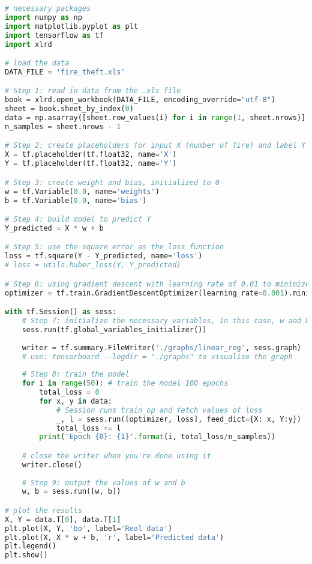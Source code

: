 \documentclass{article}
\begin{document}
\begin{lstlisting}[language=Python,morekeywords ={as}]
# necessary packages
import numpy as np
import matplotlib.pyplot as plt
import tensorflow as tf
import xlrd

# load the data
DATA_FILE = 'fire_theft.xls'

# Step 1: read in data from the .xls file
book = xlrd.open_workbook(DATA_FILE, encoding_override="utf-8")
sheet = book.sheet_by_index(0)
data = np.asarray([sheet.row_values(i) for i in range(1, sheet.nrows)])
n_samples = sheet.nrows - 1

# Step 2: create placeholders for input X (number of fire) and label Y (number of theft)
X = tf.placeholder(tf.float32, name='X')
Y = tf.placeholder(tf.float32, name='Y')

# Step 3: create weight and bias, initialized to 0
w = tf.Variable(0.0, name='weights')
b = tf.Variable(0.0, name='bias')

# Step 4: build model to predict Y
Y_predicted = X * w + b 

# Step 5: use the square error as the loss function
loss = tf.square(Y - Y_predicted, name='loss')
# loss = utils.huber_loss(Y, Y_predicted)

# Step 6: using gradient descent with learning rate of 0.01 to minimize loss
optimizer = tf.train.GradientDescentOptimizer(learning_rate=0.001).minimize(loss)

with tf.Session() as sess:
	# Step 7: initialize the necessary variables, in this case, w and b
	sess.run(tf.global_variables_initializer()) 
	
	writer = tf.summary.FileWriter('./graphs/linear_reg', sess.graph)
	# use: tensorboard --logdir = "./graphs" to visualise the graph	
	
	# Step 8: train the model
	for i in range(50): # train the model 100 epochs
		total_loss = 0
		for x, y in data:
			# Session runs train_op and fetch values of loss
			_, l = sess.run([optimizer, loss], feed_dict={X: x, Y:y}) 
			total_loss += l
		print('Epoch {0}: {1}'.format(i, total_loss/n_samples))

	# close the writer when you're done using it
	writer.close() 
	
	# Step 9: output the values of w and b
	w, b = sess.run([w, b]) 

# plot the results
X, Y = data.T[0], data.T[1]
plt.plot(X, Y, 'bo', label='Real data')
plt.plot(X, X * w + b, 'r', label='Predicted data')
plt.legend()
plt.show()
\end{lstlisting}
\end{document}
